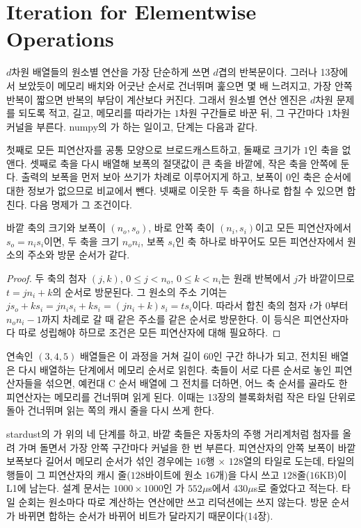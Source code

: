 \section{Iteration for Elementwise Operations}
\label{sec:nd-iteration}

$d$차원 배열들의 원소별 연산을 가장 단순하게 쓰면 $d$겹의 반복문이다. 그러나 13장에서 보았듯이 메모리 배치와 어긋난 순서로 건너뛰며 훑으면 몇 배 느려지고, 가장 안쪽 반복이 짧으면 반복의 부담이 계산보다 커진다. 그래서 원소별 연산 엔진은 $d$차원 문제를 되도록 적고, 길고, 메모리를 따라가는 $1$차원 구간들로 바꾼 뒤, 그 구간마다 $1$차원 커널을 부른다. numpy의 가 하는 일이고, 단계는 다음과 같다.

첫째로 모든 피연산자를 공통 모양으로 브로드캐스트하고, 둘째로 크기가 $1$인 축을 없앤다. 셋째로 축을 다시 배열해 보폭의 절댓값이 큰 축을 바깥에, 작은 축을 안쪽에 둔다. 출력의 보폭을 먼저 보아 쓰기가 차례로 이루어지게 하고, 보폭이 $0$인 축은 순서에 대한 정보가 없으므로 비교에서 뺀다. 넷째로 이웃한 두 축을 하나로 합칠 수 있으면 합친다. 다음 명제가 그 조건이다.

\begin{proposition}
\label{prop:coalesce}
바깥 축의 크기와 보폭이 $(n_o,s_o)$, 바로 안쪽 축이 $(n_i,s_i)$이고 모든 피연산자에서 $s_o=n_is_i$이면, 두 축을 크기 $n_on_i$, 보폭 $s_i$인 축 하나로 바꾸어도 모든 피연산자에서 원소의 주소와 방문 순서가 같다.
\end{proposition}

\begin{proof}
두 축의 첨자 $(j,k)$, $0\le j<n_o$, $0\le k<n_i$는 원래 반복에서 $j$가 바깥이므로 $t=jn_i+k$의 순서로 방문된다. 그 원소의 주소 기여는 $js_o+ks_i=jn_is_i+ks_i=(jn_i+k)s_i=ts_i$이다. 따라서 합친 축의 첨자 $t$가 $0$부터 $n_on_i-1$까지 차례로 갈 때 같은 주소를 같은 순서로 방문한다. 이 등식은 피연산자마다 따로 성립해야 하므로 조건은 모든 피연산자에 대해 필요하다.
\end{proof}

연속인 $(3,4,5)$ 배열들은 이 과정을 거쳐 길이 $60$인 구간 하나가 되고, 전치된 배열은 다시 배열하는 단계에서 메모리 순서로 읽힌다. 축들이 서로 다른 순서로 놓인 피연산자들을 섞으면, 예컨대 C 순서 배열에 그 전치를 더하면, 어느 축 순서를 골라도 한 피연산자는 메모리를 건너뛰며 읽게 된다. 이때는 13장의 블록화처럼 작은 타일 단위로 돌아 건너뛰며 읽는 쪽의 캐시 줄을 다시 쓰게 한다.

\begin{instardust}
stardust의 가 위의 네 단계를 하고, 바깥 축들은 자동차의 주행 거리계처럼 첨자를 올려 가며 돌면서 가장 안쪽 구간마다 커널을 한 번 부른다. 피연산자의 안쪽 보폭이 바깥 보폭보다 길어서 메모리 순서가 섞인 경우에는 $16$행 $\times$ $128$열의 타일로 도는데, 타일의 행들이 그 피연산자의 캐시 줄($128$바이트에 원소 $16$개)을 다시 쓰고 $128$줄($16$KB)이 L1에 남는다. 설계 문서는 $1000\times1000$인 가 $552\mu$s에서 $430\mu$s로 줄었다고 적는다. 타일 순회는 원소마다 따로 계산하는 연산에만 쓰고 리덕션에는 쓰지 않는다. 방문 순서가 바뀌면 합하는 순서가 바뀌어 비트가 달라지기 때문이다(14장).
\end{instardust}

